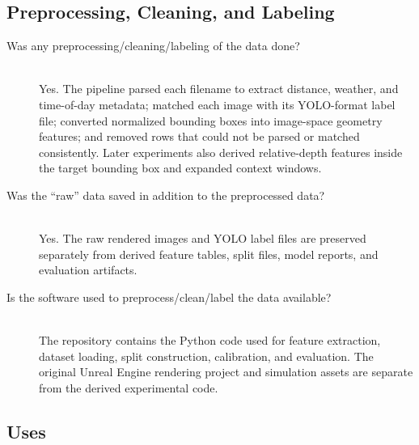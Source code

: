 \subsection{Preprocessing, Cleaning, and Labeling}

\begin{description}
    \item[Was any preprocessing/cleaning/labeling of the data done?] \hfill \\{}
    Yes. The pipeline parsed each filename to extract distance, weather, and
    time-of-day metadata; matched each image with its YOLO-format label file;
    converted normalized bounding boxes into image-space geometry features; and
    removed rows that could not be parsed or matched consistently. Later
    experiments also derived relative-depth features inside the target
    bounding box and expanded context windows.

    \item[Was the ``raw'' data saved in addition to the preprocessed data?] \hfill \\{}
    Yes. The raw rendered images and YOLO label files are preserved separately
    from derived feature tables, split files, model reports, and evaluation
    artifacts.

    \item[Is the software used to preprocess/clean/label the data available?] \hfill \\{}
    The repository contains the Python code used for feature extraction,
    dataset loading, split construction, calibration, and evaluation. The
    original Unreal Engine rendering project and simulation assets are separate
    from the derived experimental code.
\end{description}

\subsection{Uses}

